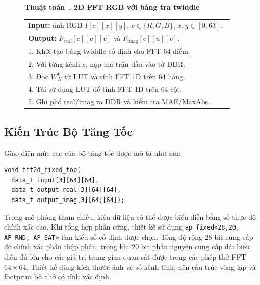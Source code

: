 ﻿\documentclass[conference]{IEEEtran}
\newcounter{algorithm}
\newcommand{\algcaption}[1]{%
    \refstepcounter{algorithm}%
    \vspace{0.10mm}%
    \noindent\textbf{Thuật toán~\thealgorithm. #1}\par\vspace{0.05mm}%
}
\begin{document}
\begin{figure}[H]
    \algcaption{2D FFT RGB với bảng tra twiddle}
    \label{alg:twiddle_lut}
    \begin{tabular}{p{0.95\linewidth}}
        \toprule
        \textbf{Input:} ảnh RGB $I[c][x][y]$, $c\in\{R,G,B\}$, $x,y\in[0,63]$.         \\
        \textbf{Output:} $F_{\mathrm{real}}[c][u][v]$ và $F_{\mathrm{imag}}[c][u][v]$. \\
        \midrule
        1. Khởi tạo bảng twiddle cố định cho FFT 64 điểm.                              \\
        2. Với từng kênh $c$, nạp ma trận đầu vào từ DDR.                              \\
        3. Đọc $W_N^k$ từ LUT và tính FFT 1D trên 64 hàng.                             \\
        4. Tái sử dụng LUT để tính FFT 1D trên 64 cột.                                 \\
        5. Ghi phổ real/imag ra DDR và kiểm tra MAE/MaxAbs.                            \\
        \bottomrule
    \end{tabular}
\end{figure}

\subsection{Kiến Trúc Bộ Tăng Tốc}
Giao diện mức cao của bộ tăng tốc được mô tả như sau:
\begin{verbatim}
void fft2d_fixed_top(
  data_t input[3][64][64],
  data_t output_real[3][64][64],
  data_t output_imag[3][64][64]);
\end{verbatim}
Trong mô phỏng tham chiếu, kiểu dữ liệu có thể được biểu diễn bằng số thực độ chính xác cao. Khi tổng hợp phần cứng, thiết kế sử dụng \texttt{ap\_fixed<28,20, AP\_RND, AP\_SAT>} làm kiểu số cố định được chọn. Tổng độ rộng 28 bit cung cấp độ chính xác phần thập phân, trong khi 20 bit phần nguyên cung cấp dải biểu diễn đủ lớn cho các giá trị trung gian quan sát được trong các phép thử FFT $64\times64$. Thiết kế dùng kích thước ảnh và số kênh tĩnh, nên cấu trúc vòng lặp và footprint bộ nhớ có tính xác định.
\end{document}
